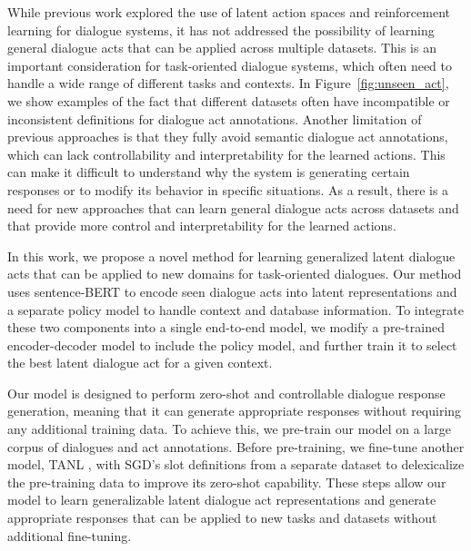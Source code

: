 While previous work \cite{zhao2019rethinking,lubis2020lava,chen-etal-2022-dialogved,bao-etal-2020-plato} explored the use of latent action spaces and reinforcement learning for dialogue systems, it has not addressed the possibility of learning general dialogue acts that can be applied across multiple datasets. 
This is an important consideration for task-oriented dialogue systems, which often need to handle a wide range of different tasks and contexts.
In Figure~\ref{fig:unseen_act}, we show examples of the fact that different datasets often have incompatible or inconsistent definitions for dialogue act annotations.
Another limitation of previous approaches is that they fully avoid semantic dialogue act annotations, which can lack controllability and interpretability for the learned actions. This can make it difficult to understand why the system is generating certain responses or to modify its behavior in specific situations. 
As a result, there is a need for new approaches that can learn general dialogue acts across datasets and that provide more control and interpretability for the learned actions.

In this work, we propose a novel method for learning generalized latent dialogue acts that can be applied to new domains for task-oriented dialogues. 
Our method uses sentence-BERT \cite{reimers-2019-sentence-bert} to encode seen dialogue acts into latent representations and a separate policy model to handle context and database information.
To integrate these two components into a single end-to-end model, we modify a pre-trained encoder-decoder model \cite{DBLP:journals/corr/abs-1910-10683,DBLP:conf/acl/LewisLGGMLSZ20} to include the policy model, and further train it to select the best latent dialogue act for a given context.

Our model is designed to perform zero-shot and controllable dialogue response generation, meaning that it can generate appropriate responses without requiring any additional training data. 
To achieve this, we pre-train our model on a large corpus of dialogues and act annotations.
Before pre-training, we fine-tune another model, TANL \cite{DBLP:conf/iclr/PaoliniAKMAASXS21}, with SGD's slot definitions \cite{rastogi2020towards} from a separate dataset to delexicalize the pre-training data to improve its zero-shot capability. 
These steps allow our model to learn generalizable latent dialogue act representations and generate appropriate responses that can be applied to new tasks and datasets without additional fine-tuning. 

